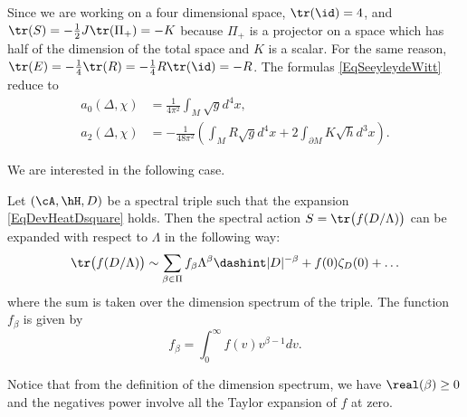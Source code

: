 Since we are working on a four dimensional space, $\tr(\id)=4$, and $\tr(S)=-\frac{ 1 }{2}J\tr(\Pi_+)=-K$ because $\Pi_+$ is a projector on a space which has half of the dimension of the total space and $K$ is a scalar. For the same reason, $\tr(E)=-\frac{ 1 }{ 4 }\tr(R)=-\frac{ 1 }{ 4 }R\tr(\id)=-R$. The formulas \eqref{EqSeeyleydeWitt} reduce to
\begin{subequations}
	\begin{align}
		a_0(\Delta,\chi) & =\frac{1}{ 4\pi^2 }\int_M\sqrt{g}d^4x,                                                      \\
		a_2(\Delta,\chi) & =-\frac{1}{ 48\pi^2 }\left( \int_M R\sqrt{g}d^4x + 2\int_{\partial M}K\sqrt{h}d^3x \right).
	\end{align}
\end{subequations}

We are interested in the following case.

\begin{theorem}			\label{ThoExpActSpect}
	Let $(\cA,\hH,D)$ be a spectral triple such that the expansion \eqref{EqDevHeatDsquare} holds. Then the spectral action $S=\tr\big( f(D/\Lambda) \big)$ can be expanded with respect to $\Lambda$ in the following way:
	\begin{equation}
		\tr\big( f(D/\Lambda) \big)\sim\sum_{\beta\in\Pi}f_{\beta}\Lambda^{\beta}\dashint| D |^{-\beta}+f(0)\zeta_D(0)+\ldots
	\end{equation}
	where the sum is taken over the dimension spectrum of the triple. The function $f_{\beta}$ is given by
	\begin{equation}			\label{Eqfbetaintdonne}
		f_{\beta}=\int_0^{\infty}f(v)v^{\beta-1}dv.
	\end{equation}
\end{theorem}

Notice that from the definition of the dimension spectrum, we have $\real(\beta)\geq 0$ and the negatives power involve all the Taylor expansion of $f$ at zero.

